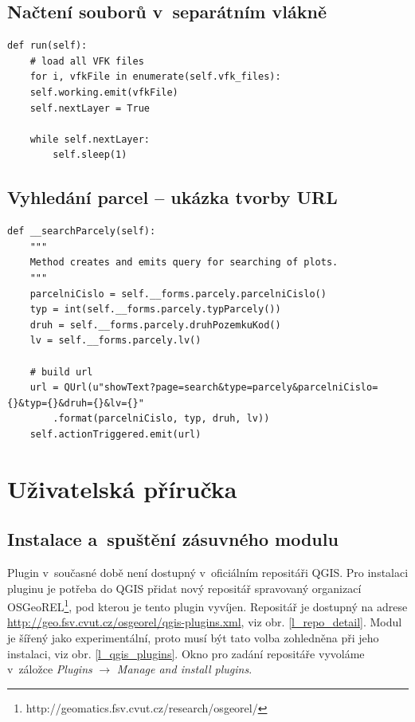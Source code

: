 \documentclass[a4paper,12pt,oneside]{book}
\begin{document}
\section{Načtení souborů v~separátním vlákně}
\begin{lstlisting}[style=python, label=l_thread_run]
 def run(self):
    # load all VFK files
    for i, vfkFile in enumerate(self.vfk_files):
	self.working.emit(vfkFile)
	self.nextLayer = True

	while self.nextLayer:
	    self.sleep(1)
\end{lstlisting}

\section{Vyhledání parcel -- ukázka tvorby URL}
\begin{lstlisting}[style=python, label=l_search_parcely]
def __searchParcely(self):
    """
    Method creates and emits query for searching of plots.
    """
    parcelniCislo = self.__forms.parcely.parcelniCislo()
    typ = int(self.__forms.parcely.typParcely())
    druh = self.__forms.parcely.druhPozemkuKod()
    lv = self.__forms.parcely.lv()

    # build url
    url = QUrl(u"showText?page=search&type=parcely&parcelniCislo={}&typ={}&druh={}&lv={}"
		.format(parcelniCislo, typ, druh, lv))
    self.actionTriggered.emit(url)
\end{lstlisting}


\chapter{Uživatelská příručka}
\label{l_prirucka}

\section{Instalace a~spuštění zásuvného modulu}
Plugin v~současné době není dostupný v~oficiálním repositáři QGIS. Pro
instalaci pluginu je potřeba do QGIS přidat nový repositář spravovaný
organizací
OSGeoREL\footnote{http://geomatics.fsv.cvut.cz/research/osgeorel/},
pod kterou je tento plugin vyvíjen. Repositář je dostupný na adrese
\url{http://geo.fsv.cvut.cz/osgeorel/qgis-plugins.xml}, viz
obr. \ref{l_repo_detail}. Modul je šířený jako experimentální, proto
musí být tato volba zohledněna při jeho instalaci, viz
obr. \ref{l_qgis_plugins}. Okno pro zadání repositáře vyvoláme
v~záložce \textit{Plugins} $\rightarrow$ \textit{Manage and install
  plugins}.
\end{document}
